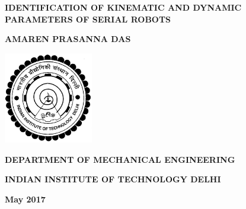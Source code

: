 \doublespacing
\thispagestyle{empty}
\begin{center}



\textbf{\large{IDENTIFICATION OF KINEMATIC AND DYNAMIC PARAMETERS OF SERIAL ROBOTS}}

\bigskip
\bigskip
\bigskip
\bigskip
\bigskip
\bigskip
\bigskip
\bigskip
\bigskip
\bigskip

\textbf{AMAREN PRASANNA DAS}

\bigskip
\bigskip
\bigskip
\bigskip
\bigskip
\bigskip
\bigskip
\bigskip
\bigskip
\bigskip
\bigskip
\bigskip
\bigskip
\bigskip
\bigskip
\bigskip
\bigskip
\bigskip
\bigskip
\bigskip
\bigskip

\includegraphics[height=4cm]{Misc_front/iitlogo.eps}

\bigskip
\bigskip
\bigskip
\bigskip
\bigskip
\bigskip

\textbf{DEPARTMENT OF MECHANICAL ENGINEERING}

\textbf{INDIAN INSTITUTE OF TECHNOLOGY DELHI}

\textbf{May 2017}



\end{center}
\newpage
\thispagestyle{empty}
\mbox{}

